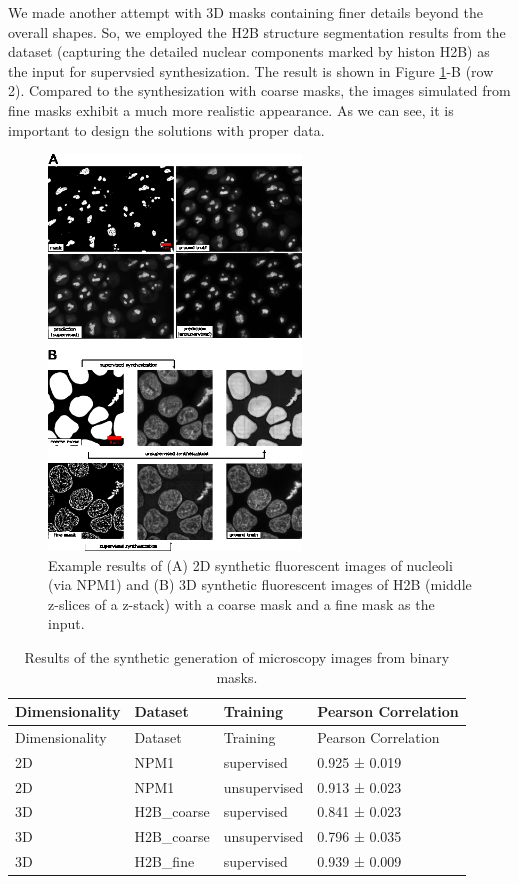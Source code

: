 We made another attempt with 3D masks containing finer details beyond the overall shapes. So, we employed the H2B structure segmentation results from the dataset (capturing the detailed nuclear components marked by histon H2B) as the input for supervsied synthesization. The result is shown in Figure \ref{fig:synthetic}-B (row 2). Compared to the synthesization with coarse masks, the images simulated from fine masks exhibit a much more realistic appearance. As we can see, it is important to design the solutions with proper data.

\begin{figure}
\hypertarget{fig:synthetic}{%
\centering
\includegraphics[width=0.6\textwidth,height=\textheight]{images/synthetic_justin.png}
\caption{Example results of (A) 2D synthetic fluorescent images of nucleoli (via NPM1) and (B) 3D synthetic fluorescent images of H2B (middle z-slices of a z-stack) with a coarse mask and a fine mask as the input.}\label{fig:synthetic}
}
\end{figure}

\begin{longtable}[]{@{}llll@{}}
\caption{Results of the synthetic generation of microscopy images from binary masks. \label{tbl:unsuper}}\label{tbl:unsuper}\tabularnewline
\toprule()
Dimensionality & Dataset & Training & Pearson Correlation \\
\midrule()
\endfirsthead
\toprule()
Dimensionality & Dataset & Training & Pearson Correlation \\
\midrule()
\endhead
2D & NPM1 & supervised & 0.925 ± 0.019 \\
2D & NPM1 & unsupervised & 0.913 ± 0.023 \\
3D & H2B\_coarse & supervised & 0.841 ± 0.023 \\
3D & H2B\_coarse & unsupervised & 0.796 ± 0.035 \\
3D & H2B\_fine & supervised & 0.939 ± 0.009 \\
\bottomrule()
\end{longtable}

